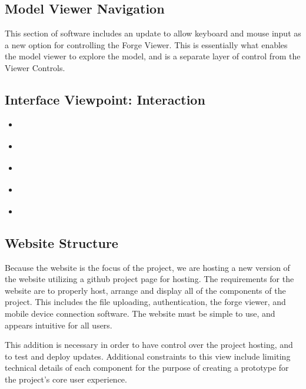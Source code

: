 \documentclass[letterpaper, 10pt, draftclsnofoot, compsoc, onecolumn]{IEEEtran}
\begin{document}
\subsection{Model Viewer Navigation}
This section of software includes an update to allow keyboard and mouse input as a new option for controlling the Forge Viewer. This is essentially what enables the model viewer to explore the model, and is a separate layer of control from the Viewer Controls. 
\subsection{Interface Viewpoint: Interaction}
\begin{itemize}
	\item[]\textbf{} 
	\item[]\textbf{} 
	\item[]\textbf{}  
	\item[]\textbf{}
	\item[]\textbf{} 
\end{itemize}

\subsection{Website Structure}
Because the website is the focus of the project, we are hosting a new version of the website utilizing a github project page for hosting. The requirements for the website are to properly host, arrange and display all of the components of the project. This includes the file uploading, authentication, the forge viewer, and mobile device connection software. The website must be simple to use, and appears intuitive for all users.

This addition is necessary in order to have control over the project hosting, and to test and deploy updates. Additional constraints to this view include limiting technical details of each component for the purpose of creating a prototype for the project's core user experience. 
\end{document}

